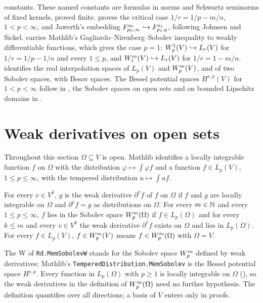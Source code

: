 constants. These named constants are formulas in norms and Schwartz seminorms of fixed kernels,
proved finite.  proves the critical case
$1/r = 1/p - m/n$, $1 < p < \infty$, and Jawerth's embedding
$F^{s_0}_{p_0,\infty} \hookrightarrow F^{s_1}_{p_1,q}$, following Johnsen and Sickel.
 carries Mathlib's Gagliardo--Nirenberg--Sobolev
inequality to weakly differentiable functions, which gives the case $p = 1$:
$W^{1}_{p}(V) \hookrightarrow L_r(V)$ for $1/r = 1/p - 1/n$ and every $1 \leq p$, and
$W^{m}_{1}(V) \hookrightarrow L_r(V)$ for $1/r = 1 - m/n$.
 identifies the real interpolation spaces of
$L_p(V)$ and $W^{m}_{p}(V)$, and of two Sobolev spaces, with Besov spaces. The Bessel
potential spaces $H^{s,p}(V)$ for $1 < p < \infty$ follow in
, the Sobolev spaces on open sets and on bounded Lipschitz
domains in .

\section{Weak derivatives on open sets}
\label{sec:weak-derivatives}

Throughout this section $\Omega \subseteq V$ is open. Mathlib identifies a locally integrable
function $f$ on $\Omega$ with the distribution $\varphi \mapsto \int \varphi f$ and a function
$f \in L_p(V)$, $1 \leq p \leq \infty$, with the tempered distribution $u \mapsto \int u f$.

\begin{definition}
\label{def:weak-line-derivative}
\leanok
For every $v \in V^k$, $g$ is the weak derivative $\partial^v f$ of $f$ on $\Omega$ if $f$ and $g$
are locally integrable on $\Omega$ and $\partial^v f = g$ as distributions on $\Omega$. For every
$m \in \mathbb{N}$ and every $1 \leq p \leq \infty$, $f$ lies in the Sobolev space $W^{m}_{p}(\Omega)$ if
$f \in L_p(\Omega)$ and for every $k \leq m$ and every $v \in V^k$ the weak derivative
$\partial^v f$ exists on $\Omega$ and lies in $L_p(\Omega)$. For every $f \in L_p(V)$,
$f \in W^{m}_{p}(V)$ means $f \in W^{m}_{p}(\Omega)$ with $\Omega = V$.
\end{definition}

The W of \texttt{Rd.\allowbreak MemSobolevW} stands for the Sobolev space $W^{m}_{p}$ defined by
weak derivatives; Mathlib's \texttt{TemperedDistribution.\allowbreak MemSobolev} is the Bessel
potential space $H^{s,p}$. Every function in $L_p(\Omega)$ with $p \geq 1$ is locally integrable
on $\Omega$ (), so the weak derivatives in the definition of
$W^{m}_{p}(\Omega)$ need no further hypothesis. The definition quantifies over all directions;
a basis of $V$ enters only in proofs.

